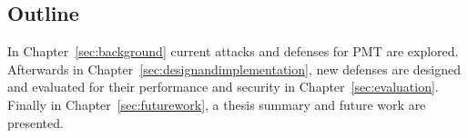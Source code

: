 \subsection{Outline}
In Chapter~\ref{sec:background} current attacks and defenses for \gls{PMT} are explored. Afterwards in Chapter~\ref{sec:designandimplementation}, new defenses are designed and evaluated for their performance and security in Chapter~\ref{sec:evaluation}. Finally in Chapter~\ref{sec:futurework}, a thesis summary and future work are presented.